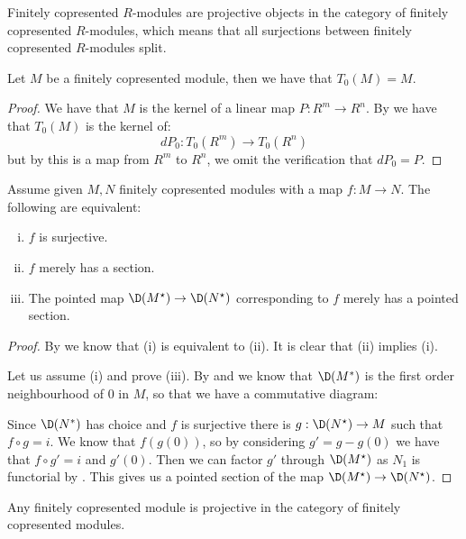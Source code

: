Finitely copresented $R$-modules are projective objects in the category of finitely copresented $R$-modules, which means that all surjections between finitely copresented $R$-modules split.

\begin{lemma}\label{tangent-copresented-modules}
Let $M$ be a finitely copresented module, then we have that $T_0(M) = M$.
\end{lemma}

\begin{proof}
We have that $M$ is the kernel of a linear map $P:R^m\to R^n$. By  we have that $T_0(M)$ is the kernel of:
\[dP_0:T_0(R^m)\to T_0(R^n)\]
but by  this is a map from $R^m$ to $R^n$, we omit the verification that $dP_0 = P$.
\end{proof}

\begin{lemma}
Assume given $M,N$ finitely copresented modules with a map $f:M\to N$. The following are equivalent:
\begin{enumerate}[(i)]
\item $f$ is surjective.
\item $f$ merely has a section.
\item The pointed map $\D(M^\star) \to \D(N^\star)$ corresponding to $f$ merely has a pointed section.
\end{enumerate}
\end{lemma}

\begin{proof}
By  we know that (i) is equivalent to (ii). It is clear that (ii) implies (i).

Let us assume (i) and prove (iii). By  and  we know that $\D(M^*)$ is the first order neighbourhood of $0$ in $M$, so that we have a commutative diagram:
\begin{center}
\end{center}
Since $\D(N^*)$ has choice and $f$ is surjective there is $g:\D(N^\star)\to M$ such that $f\circ g = i$. We know that $f(g(0))$, so by considering $g'=g-g(0)$ we have that $f\circ g' = i$ and $g'(0)$.
Then we can factor $g'$ through $\D(M^\star)$ as $N_1$ is functorial by . This gives us a pointed section of the map $\D(M^\star) \to \D(N^\star)$.
\end{proof}

\begin{corollary}
Any finitely copresented module is projective in the category of finitely copresented modules.
\end{corollary}







